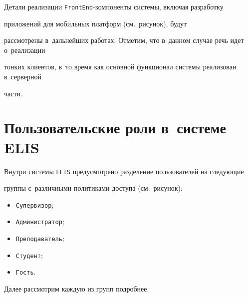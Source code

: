 Детали реализации \verb"FrontEnd"-компоненты системы, включая разработку 


приложений для мобильных платформ (см.\ рисунок), будут 


рассмотрены в~дальнейших работах. Отметим, что в~данном случае речь идет о~реализации 


тонких клиентов, в~то время как основной функционал системы реализован в~серверной 


части.





\vspace*{-3pt}





\section{Пользовательские роли в~системе ELIS}





\vspace*{-3pt}





Внутри системы \verb"ELIS" предусмотрено разделение пользователей на следующие 


группы с~различными политиками доступа (см.\ рисунок):


\begin{itemize}


\item \verb"Супервизор";


\item \verb"Администратор";


\item \verb"Преподаватель";


\item \verb"Студент";


\item \verb"Гость".


\end{itemize}





Далее рассмотрим каждую из групп подробнее.





\vspace*{-3pt}





